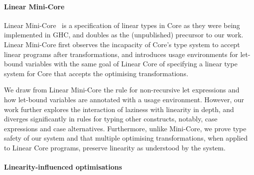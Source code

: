 \documentclass[acmsmall,review,anonymous,screen]{acmart}
\begin{document}
\paragraph{Linear Mini-Core\label{sec:linear-mini-core}}

Linear Mini-Core~\cite{cite:minicore} is a specification of linear types in
Core as they were being implemented in GHC, and doubles as the (unpublished)
precursor to our work. Linear Mini-Core first observes the incapacity of
Core's type system to accept linear programs after transformations, and 
introduces usage environments for let-bound variables with the same goal of
Linear Core of specifying a linear type system for Core that accepts the
optimising transformations.

We draw from Linear Mini-Core the rule for non-recursive let expressions and
how let-bound variables are annotated with a usage environment. However, our
work further explores the interaction of laziness with linearity in depth, and
diverges significantly in rules for typing other constructs, notably, case expressions and
case alternatives. Furthermore, unlike Mini-Core, we prove type safety of our
system and that multiple optimising transformations, when applied to Linear
Core programs, preserve linearity as understood by the system.

% 
% 

% 

\paragraph{Linearity-influenced optimisations}
\end{document}
